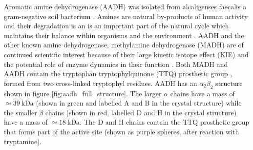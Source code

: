 Aromatic amine dehydrogenase (AADH) was isolated from alcaligenses faecalis \cite{nozakiAromaticAmineDehydrogenase1987} a gram-negative soil bacterium \cite{govindarajAromaticAmineDehydrogenase1994a}. Amines are natural by-products of human activity and their degradation is an is an important part of the natural cycle which maintains their balance within organisms and the environment \cite{chistoserdovCloningSequencingMutagenesis2001}. AADH and the other known amine dehydrogenase, methylamine dehydrogenase (MADH) are of continued scientific interest because of their large kinetic isotope effect (KIE) \cite{hyunUnusuallyLargeIsotope1995a}\cite{basranImportanceBarrierShape2001a}\cite{basranEnzymaticHTransferRequires1999}  and the potential role of enzyme dynamics in their function \cite{mcgeaghProteinDynamicsEnzyme2011}\cite{glowackiProteinDynamicsEnzyme2012a}\cite{glowackiTakingOckhamRazor2012b}. Both MADH and AADH contain the tryptophan tryptophylquinone (TTQ) prosthetic group \cite{govindarajAromaticAmineDehydrogenase1994a}\cite{McIntire817}, formed from two cross-linked tryptophyl residues. AADH has an $\alpha_{2}\beta_{2}$ structure shown in figure \ref{fig:aadh_full_structure}. The larger $\alpha$ chains have a mass of $\simeq \SI{39}{\kilo\dalton}$ (shown in green and labelled A and B in the crystal structure) while the smaller $\beta$ chains (shown in red, labelled D and H in the crystal structure) have a mass of $\simeq \SI{18}{\kilo\dalton}$. The D and H chains contain the TTQ prosthetic group that forms part of the active site (shown as purple spheres, after reaction with tryptamine). 


